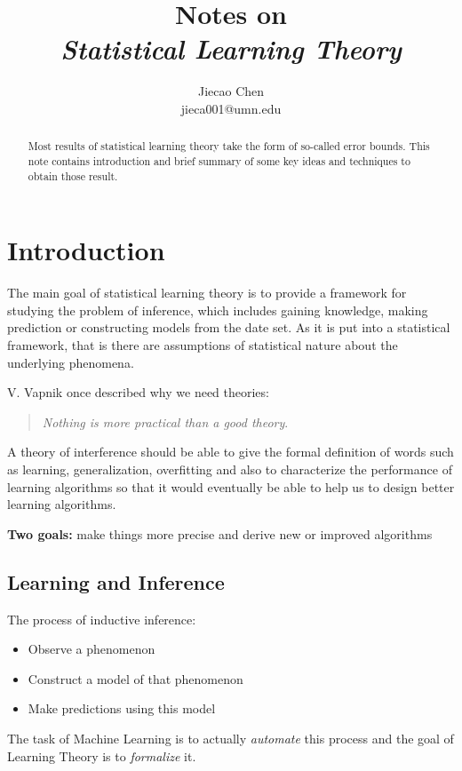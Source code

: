 \documentclass[12pt,reqno]{amsart}
\begin{document}
\title[Short version of title]{Notes on \\ \small \emph{Statistical Learning Theory}}
\author{Jiecao Chen \\ \tiny jieca001@umn.edu }

\maketitle

\begin{abstract}
Most results of statistical learning theory take the form
of so-called error bounds. This note contains introduction and
brief summary of some key ideas and techniques to obtain those
result.
\end{abstract}

\section{Introduction}
The main goal of statistical learning theory is to 
provide a framework for studying the problem of inference,
which includes gaining knowledge, making prediction or 
constructing models from the date set. As it is put into 
a statistical framework, that is there are assumptions
of statistical nature about the underlying phenomena.

V. Vapnik once described why we need theories:
\begin{quote}
	\textit{Nothing is more practical than a good theory}.
\end{quote}

A theory of interference should be able to give the 
formal definition of words such as learning, generalization,
overfitting and also to characterize the performance of 
learning algorithms so that it would eventually be able to
help us to design better learning algorithms.

\textbf{Two goals:} make things more precise and derive new or improved
algorithms

\subsection{Learning and Inference}
The process of inductive inference:
\begin{itemize}
\item Observe a phenomenon
\item Construct a model of that phenomenon
\item Make predictions using this model
\end{itemize}
The task of Machine Learning is to actually \textit{automate} this 
process and the goal of Learning Theory is to \textit{formalize} it.
\end{document}
